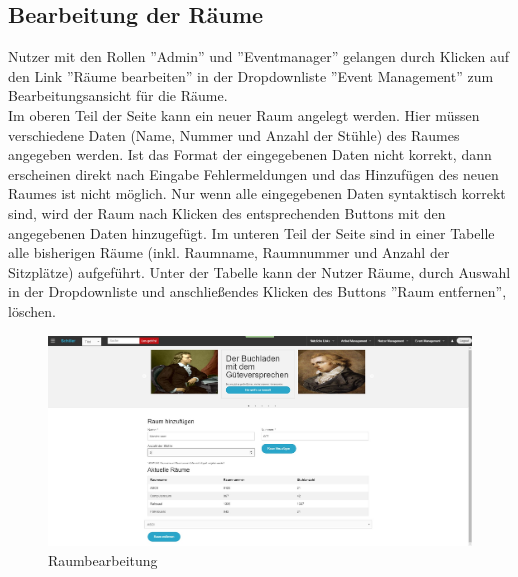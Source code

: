 \documentclass[a4paper]{article}
\begin{document}
\FloatBarrier

\subsection{Bearbeitung der Räume}

Nutzer mit den Rollen ''Admin'' und ''Eventmanager'' gelangen durch Klicken auf den Link ''Räume bearbeiten'' in der Dropdownliste ''Event Management'' zum Bearbeitungsansicht für die Räume. \\
Im oberen Teil der Seite kann ein neuer Raum angelegt werden. Hier müssen verschiedene Daten (Name, Nummer und Anzahl der Stühle) des Raumes angegeben werden. Ist das Format der eingegebenen Daten nicht korrekt, dann erscheinen direkt nach Eingabe Fehlermeldungen und das Hinzufügen des neuen Raumes ist nicht möglich. Nur wenn alle eingegebenen Daten syntaktisch korrekt sind, wird der Raum nach Klicken des entsprechenden Buttons mit den angegebenen Daten hinzugefügt.
Im unteren Teil der Seite sind in einer Tabelle alle bisherigen Räume (inkl. Raumname, Raumnummer und Anzahl der Sitzplätze) aufgeführt. Unter der Tabelle kann der Nutzer Räume, durch Auswahl in der Dropdownliste und anschließendes Klicken des Buttons ''Raum entfernen'', löschen.

\begin{figure}[ht]
\centering
\includegraphics[width=1.0\textwidth]{Raeume.jpg}
\caption{Raumbearbeitung}
\end{figure}
\smallskip

\FloatBarrier
\end{document}
